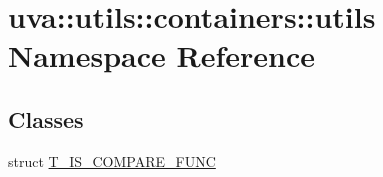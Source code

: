 \hypertarget{namespaceuva_1_1utils_1_1containers_1_1utils}{}\section{uva\+:\+:utils\+:\+:containers\+:\+:utils Namespace Reference}
\label{namespaceuva_1_1utils_1_1containers_1_1utils}
\subsection*{Classes}
\begin{DoxyCompactItemize}
\item 
struct \hyperlink{structuva_1_1utils_1_1containers_1_1utils_1_1_t___i_s___c_o_m_p_a_r_e___f_u_n_c}{T\+\_\+\+I\+S\+\_\+\+C\+O\+M\+P\+A\+R\+E\+\_\+\+F\+U\+N\+C}
\end{DoxyCompactItemize}

